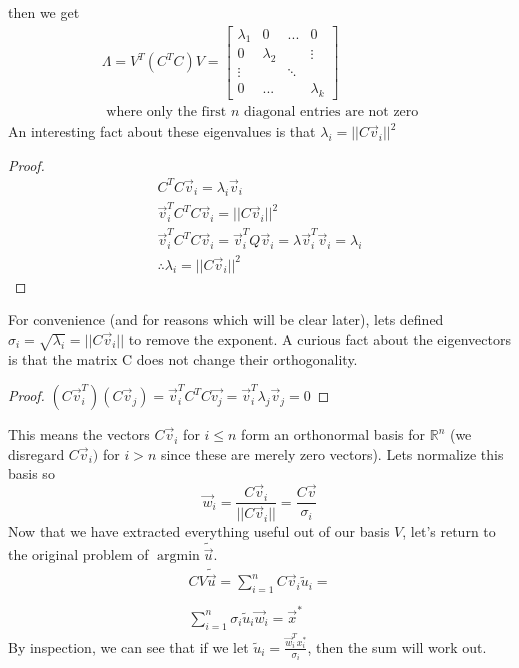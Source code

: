 \documentclass{article}
\newtheorem{proof}{Proof}
\DeclareMathOperator*{\argmin}{argmin}
\begin{document}
then we get
\[
    \begin{array}{c}
        \Lambda = V^T(C^TC)V=\left[
        \begin{array}{cccc}
            \lambda_1 & 0 & ... & 0\\
            0 & \lambda _2 & & \vdots\\
            \vdots & & \ddots & \\
            0 & ... & & \lambda_k
        \end{array}
    \right]\\
    \text{ where only the first } n \text{ diagonal entries are not zero}
    \end{array}
\]
An interesting fact about these eigenvalues is that $\lambda_i = ||C\vec{v}_i||^2$
\begin{proof}
    \[
        \begin{array}{c}
            C^TC\vec{v}_i = \lambda_i \vec{v}_i\\
            \vec{v}_i^TC^TC\vec{v}_i = ||C\vec{v}_i||^2 \\
            \vec{v}_i^TC^TC\vec{v}_i = \vec{v}_i^TQ\vec{v}_i = \lambda \vec{v}_i^T\vec{v}_i = \lambda_i\\
            \therefore \lambda_i = ||C\vec{v}_i||^2
        \end{array}
    \]
\end{proof}
For convenience (and for reasons which will be clear later), lets defined $\sigma_i=\sqrt{\lambda_i} = ||C\vec{v}_i||$ to remove the exponent.
A curious fact about the eigenvectors is that the matrix C does not change their orthogonality.
\begin{proof}
    $(C\vec{v}_i^T)(C\vec{v}_j)=\vec{v}_i^TC^TC\vec{v_j}=\vec{v}_i^T\lambda_j \vec{v}_j = 0$
\end{proof}
This means the vectors $C\vec{v}_i$ for $i \le n$ form an orthonormal basis for $\mathbb{R}^n$ (we disregard $C\vec{v}_i)$ for $i > n$ since these are merely zero vectors).
Lets normalize this basis so $$\vec{w}_i=\frac{C\vec{v}_i}{||C\vec{v}_i||}=\frac{C\vec{v}}{\sigma_i}$$
Now that we have extracted everything useful out of our basis $V$, let's return to the original problem of $\argmin{\tilde{\vec{u}}}$.
\[
    \begin{array}{c}
        CV\tilde{\vec{u}}=\sum_{i=1}^{n}{C\vec{v}_i\tilde{u}_i} =\\\\
        \sum_{i=1}^{n}{\sigma_i\tilde{u}_i\vec{w}_i} = \vec{x}^*
    \end{array}
\]
By inspection, we can see that if we let $\tilde{u}_i=\frac{\vec{w}^T_ix^*_i}{\sigma_i}$, then the sum will work out.
\end{document}
